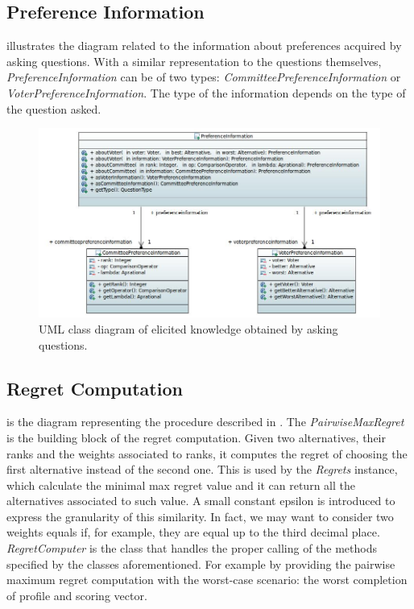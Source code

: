 \subsection{Preference Information}

 illustrates the diagram related to the information about preferences acquired by asking questions. With a similar representation to the questions themselves, \textit{PreferenceInformation} can be of two types: \textit{CommitteePreferenceInformation} or \textit{VoterPreferenceInformation}. The type of the information depends on the type of the question asked.

\begin{figure}
	\centering
	\includegraphics[width=\textwidth]{uml/prefinfo.jpeg}
	\caption{UML class diagram of elicited knowledge obtained by asking questions.}
	\label{uml:prefinfo}
\end{figure}

\pagebreak

\subsection{Regret Computation}
 is the diagram representing the procedure described in . The \textit{PairwiseMaxRegret} is the building block of the regret computation. Given two alternatives, their ranks and the weights associated to ranks, it computes the regret of choosing the first alternative instead of the second one. This is used by the \textit{Regrets} instance, which calculate the minimal max regret value and it can return all the alternatives associated to such value. A small constant epsilon is introduced to express the granularity of this similarity. In fact, we may want to consider two weights equals if, for example, they are equal up to the third decimal place. \textit{RegretComputer} is the class that handles the proper calling of the methods specified by the classes aforementioned. For example by providing the pairwise maximum regret computation with the worst-case scenario: the worst completion of profile and scoring vector.


